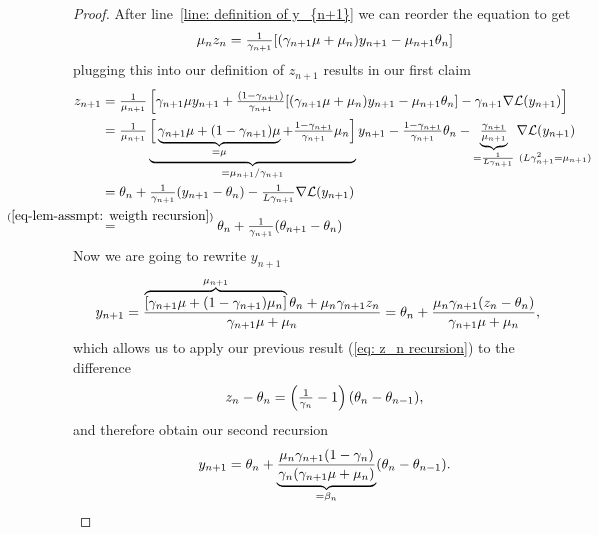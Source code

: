 \begin{proof}
	After line~\ref{line: definition of y_{n+1}} we can reorder the equation to
	get
	\begin{align*}
		\mu_n z_n
		= \tfrac{1}{\gamma_{n+1}} [(\gamma_{n+1}\mu + \mu_n)y_{n+1} - \mu_{n+1}\theta_n]
	\end{align*}
	plugging this into our definition of \(z_{n+1}\) results in our first claim
	\begin{align*}
		z_{n+1}
		&= \tfrac{1}{\lbound_{n+1}}
		\left[
			{ \gamma_{n+1}\lbound} y_{n+1}
			+ \tfrac{(1-\gamma_{n+1})}{\gamma_{n+1}}
			[(\gamma_{n+1}\lbound + \lbound_n)y_{n+1} - \lbound_{n+1}\weights_n]
			- { \gamma_{n+1}}\nabla\Loss(y_{n+1})
		\right]\\
		&=\tfrac{1}{\lbound_{n+1}} \underbrace{\Big[
			\underbrace{\gamma_{n+1}\lbound + (1-\gamma_{n+1})\lbound}_{=\lbound}
			+ \tfrac{1-\gamma_{n+1}}{\gamma_{n+1}}\lbound_n
		\Big]}_{
			=\lbound_{n+1}/\gamma_{n+1}
		}y_{n+1}
		-\tfrac{1-\gamma_{n+1}}{\gamma_{n+1}}\weights_n
		-\underbrace{\tfrac{\gamma_{n+1}}{\lbound_{n+1}}}_{
			=\frac{1}{\ubound\gamma_{n+1}} \mathrlap{\ (L\gamma_{n+1}^2 = \lbound_{n+1})}
		}\nabla\Loss(y_{n+1})\\
		&= \weights_n + \tfrac{1}{\gamma_{n+1}}(y_{n+1} - \weights_n)
		- \tfrac{1}{\ubound\gamma_{n+1}}\nabla\Loss(y_{n+1})\\
		&\lxeq{(\ref{eq-lem-assmpt: weigth recursion})}
		\weights_n + \tfrac{1}{\gamma_{n+1}}(\weights_{n+1}-\weights_n)
	\end{align*}
	Now we are going to rewrite \(y_{n+1}\)
	\begin{align*}
		y_{n+1}
		&= \frac{
			\overbrace{[\gamma_{n+1} \mu + (1-\gamma_{n+1})\mu_n]}^{\mu_{n+1}}\theta_n
			+ \mu_n \gamma_{n+1} z_n
		}{\gamma_{n+1}\mu +\mu_n}
		=\theta_n
		+ \frac{\mu_n \gamma_{n+1} (z_n - \theta_n)}{\gamma_{n+1}\mu +\mu_n},
	\end{align*}
	which allows us to apply our previous result (\ref{eq: z_n recursion}) to the difference
	\begin{align*}
		z_n - \theta_n
		= \left(\tfrac1{\gamma_n} -1\right)(\theta_n-\theta_{n-1}),
	\end{align*}
	and therefore obtain our second recursion
	\begin{align*}
		y_{n+1}
		=\weights_n
		+ \underbrace{
			\frac{\lbound_n \gamma_{n+1}(1-\gamma_n)}{\gamma_n(\gamma_{n+1}\lbound +\lbound_n)}
		}_{=\momCoeff_n}
		(\weights_n-\weights_{n-1}).

\end{align*}
\end{proof}
